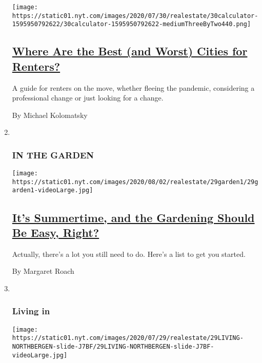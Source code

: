 \begin{enumerate}
  \texttt{[image: https://static01.nyt.com/images/2020/07/30/realestate/30calculator-1595950792622/30calculator-1595950792622-mediumThreeByTwo440.png]}

  \hypertarget{where-are-the-best-and-worst-cities-for-renters}{%
  \subsection{\texorpdfstring{\href{/2020/07/30/realestate/best-worst-cities-for-renters-coronavirus-relocation.html}{Where
  Are the Best (and Worst) Cities for
  Renters?}}{Where Are the Best (and Worst) Cities for Renters?}}\label{where-are-the-best-and-worst-cities-for-renters}}

  A guide for renters on the move, whether fleeing the pandemic,
  considering a professional change or just looking for a change.

  By Michael Kolomatsky
\item ~
  \hypertarget{in-the-garden}{%
  \subsubsection{IN THE GARDEN}\label{in-the-garden}}

  \texttt{[image: https://static01.nyt.com/images/2020/08/02/realestate/29garden1/29garden1-videoLarge.jpg]}

  \hypertarget{its-summertime-and-the-gardening-should-be-easy-right}{%
  \subsection{\texorpdfstring{\href{/2020/07/29/realestate/garden-summer-august-chores.html}{It's
  Summertime, and the Gardening Should Be Easy,
  Right?}}{It's Summertime, and the Gardening Should Be Easy, Right?}}\label{its-summertime-and-the-gardening-should-be-easy-right}}

  Actually, there's a lot you still need to do. Here's a list to get you
  started.

  By Margaret Roach
\item ~
  \hypertarget{living-in}{%
  \subsubsection{Living in}\label{living-in}}

  \texttt{[image: https://static01.nyt.com/images/2020/07/29/realestate/29LIVING-NORTHBERGEN-slide-J7BF/29LIVING-NORTHBERGEN-slide-J7BF-videoLarge.jpg]}


\end{enumerate}
